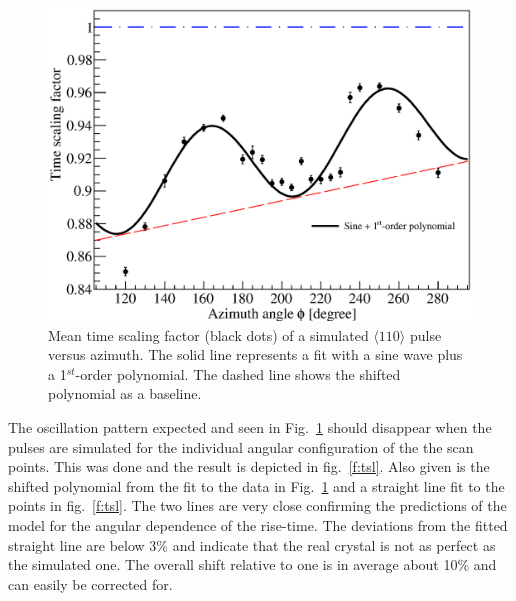 \documentclass[epj]{svjour}
\begin{document}
\begin{figure}[htpb]
\centering
\includegraphics[width=\linewidth]{tsc}
\caption{Mean time scaling factor (black dots) of a simulated $\langle
110 \rangle$ pulse versus azimuth. The solid line represents a fit
with a sine wave plus a 1$^{st}$-order polynomial. The dashed line
shows the shifted polynomial as a baseline.}
\label{f:tsc}
\end{figure}

The oscillation pattern expected and seen in Fig.~\ref{f:tsc} should
disappear when the pulses are simulated for the individual angular
configuration of the the scan points. This was done and the result is
depicted in fig.~\ref{f:tsl}. Also given is the shifted polynomial
from the fit to the data in Fig.~\ref{f:tsc} and a straight line fit
to the points in fig.~\ref{f:tsl}. The two lines are very close
confirming the predictions of the model for the angular dependence of
the rise-time. The deviations from the fitted straight line are below
3\% and indicate that the real crystal is not as perfect as the
simulated one. The overall shift relative to one is in average about
10\% and can easily be corrected for.
\end{document}
